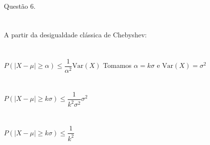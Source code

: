 \documentclass[12pt]{article}
\begin{document}
\indent Questão 6.\\\\\\
A partir da desigualdade clássica de Chebyshev:\\\\\\
$P(|X-\mu| \geq \alpha) \leq \dfrac{1}{\alpha^{2}} \text{Var}(X)$ \hfill Tomamos $\alpha = k\sigma$ e $\text{Var}(X) = \sigma^{2}$\\\\\\
$P(|X-\mu| \geq k\sigma) \leq \dfrac{1}{k^{2}\sigma^{2}} \sigma^{2}$\\\\\\
$P(|X-\mu| \geq k\sigma) \leq \dfrac{1}{k^{2}}$\\\\\\
\end{document}
